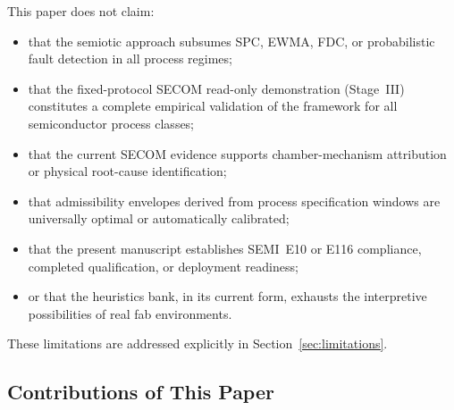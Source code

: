 \documentclass[11pt,letterpaper]{article}
\theoremstyle{scresult}
\begin{document}
This paper does not claim:
\begin{itemize}
  \item that the semiotic approach subsumes SPC, EWMA, FDC, or probabilistic
        fault detection in all process regimes;
  \item that the fixed-protocol SECOM read-only demonstration (Stage~III) constitutes a complete empirical
        validation of the framework for all semiconductor process classes;
  \item that the current SECOM evidence supports chamber-mechanism attribution
        or physical root-cause identification;
  \item that admissibility envelopes derived from process specification windows
        are universally optimal or automatically calibrated;
  \item that the present manuscript establishes SEMI~E10 or E116 compliance,
        completed qualification, or deployment readiness;
  \item or that the heuristics bank, in its current form, exhausts the
        interpretive possibilities of real fab environments.
\end{itemize}

These limitations are addressed explicitly in Section~\ref{sec:limitations}.

\subsection{Contributions of This Paper}
\end{document}

